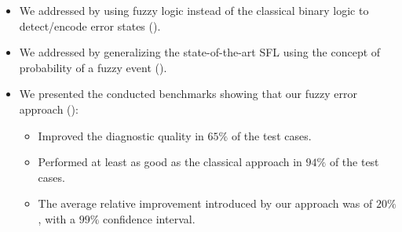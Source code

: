 \begin{itemize}[nolistsep]
\item We addressed  by using fuzzy
  logic instead of the classical binary logic to detect/encode error
  states ().
\item We addressed  by
  generalizing the state-of-the-art \ac{SFL} using the concept of
  probability of a fuzzy event
  ().
\item We presented the conducted benchmarks showing that our fuzzy
  error approach ():
  \begin{itemize}
  \item Improved the diagnostic quality in $65\%$ of the test cases.
  \item Performed at least as good as the classical approach in $94\%$
    of the test cases.
  \item The average relative improvement introduced by our approach
    was of $20\%$, with a $99\%$ confidence interval.
  \end{itemize}
\end{itemize}
